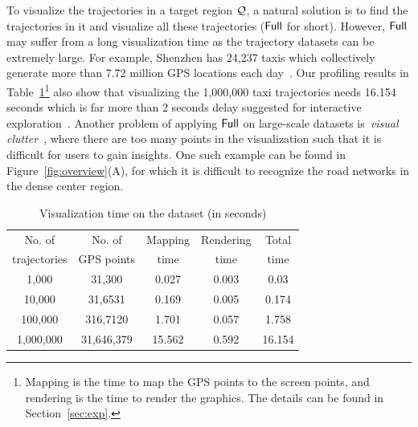  To visualize the trajectories in a target region $\mathcal{Q}$, a natural solution is to find the trajectories in it and visualize all these trajectories ($\mathsf{Full}$ for short). However, $\mathsf{Full}$ may suffer from a long visualization time as the trajectory datasets can be extremely large. For example, Shenzhen has 24,237 taxis which collectively generate more than 7.72 million GPS locations each day~\cite{sz}. Our profiling results in Table~\ref{tab:gpu}\footnote{Mapping is the time to map the GPS points to the screen points, and rendering is the time to render the graphics. The details can be found in Section~\ref{sec:exp}.} also show that visualizing the 1,000,000 taxi trajectories needs 16.154 seconds which is far more than 2 seconds delay suggested for interactive exploration~\cite{shneiderman1984response}.
Another problem of applying $\mathsf{Full}$ on large-scale datasets is~\textit{visual clutter}~\cite{kwon2017sampling}, where there are too many points in the visualization such that it is difficult for users to gain insights. One such example can be found in Figure~\ref{fig:overview}(A), for which it is difficult to recognize the road networks in the dense center region.   


\begin{table}
	\centering
	\small
	\caption{Visualization time on the \pt{} dataset (in seconds)}
	\vspace{-2mm}
	\trim
	\begin{tabular}{|c|c|c|c|c|} \hline
		No. of  & No. of & Mapping & Rendering & Total \\
		trajectories &  GPS points & time & time & time \\ \hline
		1,000& 31,300 & 0.027 & 0.003 & 0.03 \\ \hline
		10,000& 31,6531 & 0.169 & 0.005 & 0.174\\ \hline
		100,000& 316,7120 & 1.701 & 0.057 & 1.758 \\ \hline
		1,000,000& 31,646,379 & 15.562 & 0.592 & 16.154 \\ \hline
	\end{tabular}	\label{tab:gpu}
	\trim \trim 
\end{table}

